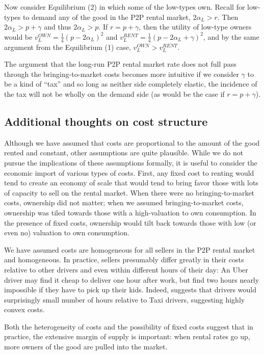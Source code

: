\documentclass[11pt]{article}
\begin{document}
Now consider Equilibrium (2) in which some of the low-types own.
Recall for low-types to demand any of the good in the P2P rental market, $2\alpha_L > r$. 
Then $2\alpha_L > p + \gamma$ and thus $2\alpha_L > p$.
If $r = p + \gamma$, then the utility of low-type owners would be $v_L^{OWN} = \frac{1}{4}(p - 2\alpha_L)^2$ and $v_L^{RENT} = \frac{1}{4}(p - 2\alpha_L + \gamma)^2$, and by the same argument from the Equilibrium (1) case, $v_L^{OWN} > v_L^{RENT}$. 

The argument that the long-run P2P rental market rate does not full pass through the bringing-to-market costs becomes more intuitive if we consider $\gamma$ to be a kind of ``tax'' and so long as neither side completely elastic, the incidence of the tax will not be wholly on the demand side (as would be the case if $r = p + \gamma$). 

\subsection{Additional thoughts on cost structure}

Although we have assumed that costs are proportional to the amount of the good rented and constant, other assumptions are quite plausible.
While we do not pursue the implications of these assumptions formally, it is useful to consider the economic import of various types of costs.
First, any fixed cost to renting would tend to create an economy of scale that would tend to bring favor those with lots of capacity to sell on the rental market.
When there were no bringing-to-market costs, ownership did not matter;
when we assumed bringing-to-market costs, ownership was tiled towards those with a high-valuation to own consumption.
In the presence of fixed costs, ownership would tilt back towards those with low (or even no) valuation to own consumption.

We have assumed costs are homogeneous for all sellers in the P2P rental market and homogeneous.
In practice, sellers presumably differ greatly in their costs relative to other drivers and even within different hours of their day:
An Uber driver may find it cheap to deliver one hour after work, but find two hours nearly impossible if they have to pick up their kids.  
Indeed, \cite{hall2015analysis} suggests that drivers would surprisingly small number of hours relative to Taxi drivers, suggesting highly convex costs. 

Both the heterogeneity of costs and the possibility of fixed costs suggest that in practice, the extensive margin of supply is important:
when rental rates go up, more owners of the good are pulled into the market. 
\end{document}
